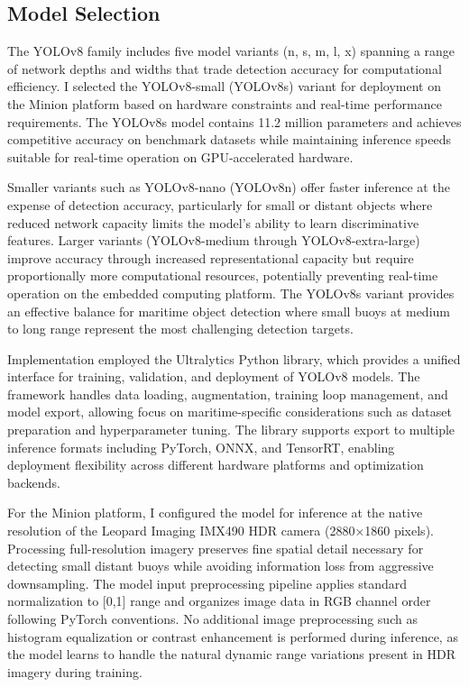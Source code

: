 \documentclass{erauthesis}
\begin{document}
\subsection{Model Selection} \label{sec:yolo_model_selection}

The YOLOv8 family includes five model variants (n, s, m, l, x) spanning a range of network depths and widths that trade detection accuracy for computational efficiency.
I selected the YOLOv8-small (YOLOv8s) variant for deployment on the Minion platform based on hardware constraints and real-time performance requirements.
The YOLOv8s model contains 11.2 million parameters and achieves competitive accuracy on benchmark datasets while maintaining inference speeds suitable for real-time operation on GPU-accelerated hardware.

Smaller variants such as YOLOv8-nano (YOLOv8n) offer faster inference at the expense of detection accuracy, particularly for small or distant objects where reduced network capacity limits the model's ability to learn discriminative features.
Larger variants (YOLOv8-medium through YOLOv8-extra-large) improve accuracy through increased representational capacity but require proportionally more computational resources, potentially preventing real-time operation on the embedded computing platform.
The YOLOv8s variant provides an effective balance for maritime object detection where small buoys at medium to long range represent the most challenging detection targets.

Implementation employed the Ultralytics Python library, which provides a unified interface for training, validation, and deployment of YOLOv8 models.
The framework handles data loading, augmentation, training loop management, and model export, allowing focus on maritime-specific considerations such as dataset preparation and hyperparameter tuning.
The library supports export to multiple inference formats including PyTorch, ONNX, and TensorRT, enabling deployment flexibility across different hardware platforms and optimization backends.

For the Minion platform, I configured the model for inference at the native resolution of the Leopard Imaging IMX490 \ac{HDR} camera (2880×1860 pixels).
Processing full-resolution imagery preserves fine spatial detail necessary for detecting small distant buoys while avoiding information loss from aggressive downsampling.
The model input preprocessing pipeline applies standard normalization to [0,1] range and organizes image data in RGB channel order following PyTorch conventions.
No additional image preprocessing such as histogram equalization or contrast enhancement is performed during inference, as the model learns to handle the natural dynamic range variations present in \ac{HDR} imagery during training.
\end{document}
